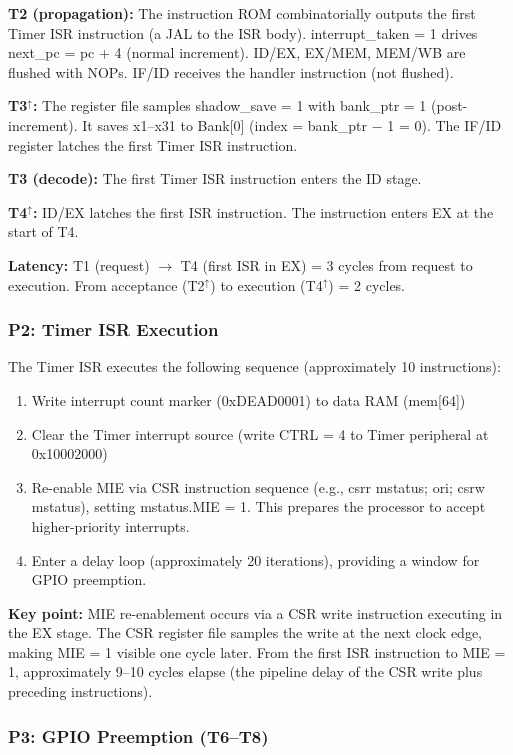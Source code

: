 \documentclass[letterpaper,journal]{IEEEtran}
\begin{document}
\textbf{T2 (propagation):} The instruction ROM combinatorially outputs the first Timer ISR instruction (a JAL to the ISR body). interrupt\_taken = 1 drives next\_pc = pc + 4 (normal increment). ID/EX, EX/MEM, MEM/WB are flushed with NOPs. IF/ID receives the handler instruction (not flushed).

\textbf{T3$^\uparrow$:} The register file samples shadow\_save = 1 with bank\_ptr = 1 (post-increment). It saves x1--x31 to Bank[0] (index = bank\_ptr $-$ 1 = 0). The IF/ID register latches the first Timer ISR instruction.

\textbf{T3 (decode):} The first Timer ISR instruction enters the ID stage.

\textbf{T4$^\uparrow$:} ID/EX latches the first ISR instruction. The instruction enters EX at the start of T4.

\textbf{Latency:} T1 (request) $\rightarrow$ T4 (first ISR in EX) = 3 cycles from request to execution. From acceptance (T2$^\uparrow$) to execution (T4$^\uparrow$) = 2 cycles.

\subsubsection{P2: Timer ISR Execution}

The Timer ISR executes the following sequence (approximately 10 instructions):
\begin{enumerate}
\item Write interrupt count marker (0xDEAD0001) to data RAM (mem[64])
\item Clear the Timer interrupt source (write CTRL = 4 to Timer peripheral at 0x10002000)
\item Re-enable MIE via CSR instruction sequence (e.g., csrr mstatus; ori; csrw mstatus), setting mstatus.MIE = 1. This prepares the processor to accept higher-priority interrupts.
\item Enter a delay loop (approximately 20 iterations), providing a window for GPIO preemption.
\end{enumerate}

\textbf{Key point:} MIE re-enablement occurs via a CSR write instruction executing in the EX stage. The CSR register file samples the write at the next clock edge, making MIE = 1 visible one cycle later. From the first ISR instruction to MIE = 1, approximately 9--10 cycles elapse (the pipeline delay of the CSR write plus preceding instructions).

\subsubsection{P3: GPIO Preemption (T6--T8)}
\end{document}
